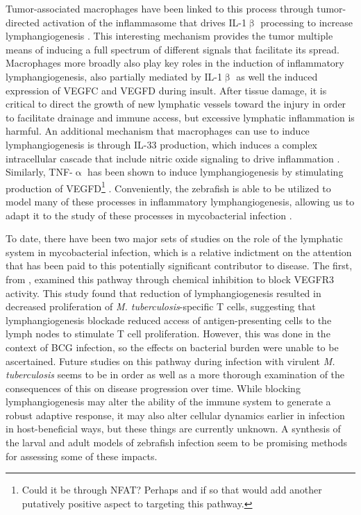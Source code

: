 Tumor-associated macrophages have been linked to this process through tumor-directed activation of the inflammasome that drives IL-1$\upbeta$ processing to increase lymphangiogenesis \citep{Weichand2017}. This interesting mechanism provides the tumor multiple means of inducing a full spectrum of different signals that facilitate its spread. Macrophages more broadly also play key roles in the induction of inflammatory lymphangiogenesis, also partially mediated by IL-1$\upbeta$ as well the induced expression of VEGFC and VEGFD during insult. After tissue damage, it is critical to direct the growth of new lymphatic vessels toward the injury in order to facilitate drainage and immune access, but excessive lymphatic inflammation is harmful. An additional mechanism that macrophages can use to induce lymphangiogenesis is through IL-33 production, which induces a complex intracellular cascade that include nitric oxide signaling to drive inflammation \citep{Han2017}. Similarly, TNF-$\upalpha$ has been shown to induce lymphangiogenesis by stimulating production of VEGFD\footnote{Could it be through NFAT? Perhaps and if so that would add another putatively positive aspect to targeting this pathway.} \citep{Hong2016}. Conveniently, the zebrafish is able to be utilized to model many of these processes in inflammatory lymphangiogenesis, allowing us to adapt it to the study of these processes in mycobacterial infection \citep{Okuda2015}.

To date, there have been two major sets of studies on the role of the lymphatic system in mycobacterial infection, which is a relative indictment on the attention that has been paid to this potentially significant contributor to disease. The first, from \citet{Harding2015}, examined this pathway through chemical inhibition to block VEGFR3 activity. This study found that reduction of lymphangiogenesis resulted in decreased proliferation of \textit{M. tuberculosis}-specific T cells, suggesting that lymphangiogenesis blockade reduced access of antigen-presenting cells to the lymph nodes to stimulate T cell proliferation. However, this was done in the context of BCG infection, so the effects on bacterial burden were unable to be ascertained. Future studies on this pathway during infection with virulent \textit{M. tuberculosis} seems to be in order as well as a more thorough examination of the consequences of this on disease progression over time. While blocking lymphangiogenesis may alter the ability of the immune system to generate a robust adaptive response, it may also alter cellular dynamics earlier in infection in host-beneficial ways, but these things are currently unknown. A synthesis of the larval and adult models of zebrafish infection seem to be promising methods for assessing some of these impacts.

